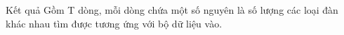 Kết quả
Gồm T dòng, mỗi dòng chứa một số nguyên là số lượng các loại đàn khác nhau tìm được tương ứng với bộ dữ liệu vào.